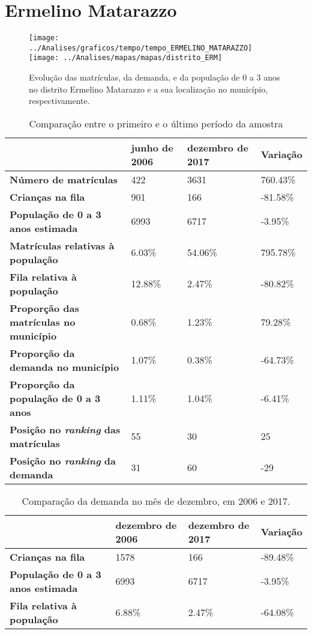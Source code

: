 \section{Ermelino Matarazzo}
\begin{figure}[H]
\centering
\texttt{[image: ../Analises/graficos/tempo/tempo\_ERMELINO\_MATARAZZO]}
\texttt{[image: ../Analises/mapas/mapas/distrito\_ERM]}
\caption{Evolução das matrículas, da demanda, e da população de 0 a 3 anos no distrito Ermelino Matarazzo e a sua localização no município, respectivamente.}
\end{figure}
\begin{table}[H]
\begin{tabular}{l|l|l|l}
\textbf{}                                      & \textbf{junho de 2006}       & \textbf{dezembro de 2017}    & \textbf{Variação} \\ \hline
\textbf{Número de matrículas}                  & 422 & 3631 & 760.43\% \\ \hline
\textbf{Crianças na fila}                      & 901 & 166 & -81.58\% \\ \hline
\textbf{População de 0 a 3 anos estimada}      & 6993 & 6717 & -3.95\% \\ \hline
\textbf{Matrículas relativas à população}      & 6.03\% & 54.06\% & 795.78\% \\ \hline
\textbf{Fila relativa à população}             & 12.88\% & 2.47\% & -80.82\% \\ \hline
\textbf{Proporção das matrículas no município} & 0.68\% & 1.23\% & 79.28\% \\ \hline
\textbf{Proporção da demanda no município}     & 1.07\% & 0.38\% & -64.73\% \\ \hline
\textbf{Proporção da população de 0 a 3 anos}  & 1.11\% & 1.04\% & -6.41\% \\ \hline
\textbf{Posição no \textit{ranking} das matrículas}     & 55 & 30 & 25 \\ \hline
\textbf{Posição no \textit{ranking} da demanda}         & 31 & 60 & -29 \\ 
\end{tabular}
\caption{Comparação entre o primeiro e o último período da amostra}
\end{table}
\begin{table}[H]
\begin{tabular}{l|l|l|l}
\textbf{}                                 & \textbf{dezembro de 2006} & \textbf{dezembro de 2017} & \textbf{Variação} \\ \hline
\textbf{Crianças na fila}                      & 1578 & 166 & -89.48\% \\ \hline
\textbf{População de 0 a 3 anos estimada}      & 6993 & 6717 & -3.95\% \\ \hline
\textbf{Fila relativa à população}             & 6.88\% & 2.47\% & -64.08\% \\
\end{tabular}
\caption{Comparação da demanda no mês de dezembro, em 2006 e 2017.}
\end{table}
